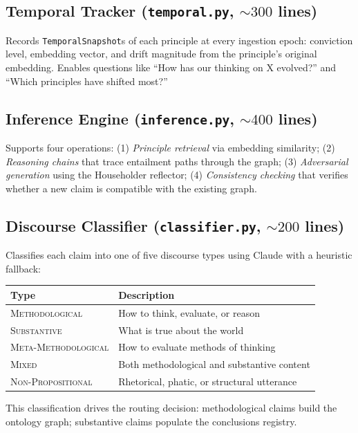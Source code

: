\documentclass[11pt,letterpaper]{article}
\begin{document}
\subsection{Temporal Tracker (\texttt{temporal.py}, ${\sim}300$ lines)}

Records \texttt{TemporalSnapshot}s of each principle at every ingestion epoch: conviction level, embedding vector, and drift magnitude from the principle's original embedding. Enables questions like ``How has our thinking on X evolved?'' and ``Which principles have shifted most?''

\subsection{Inference Engine (\texttt{inference.py}, ${\sim}400$ lines)}

Supports four operations: (1) \emph{Principle retrieval} via embedding similarity; (2) \emph{Reasoning chains} that trace entailment paths through the graph; (3) \emph{Adversarial generation} using the Householder reflector; (4) \emph{Consistency checking} that verifies whether a new claim is compatible with the existing graph.

\subsection{Discourse Classifier (\texttt{classifier.py}, ${\sim}200$ lines)}

Classifies each claim into one of five discourse types using Claude with a heuristic fallback:

\begin{center}
\begin{tabular}{ll}
\toprule
\textbf{Type} & \textbf{Description} \\
\midrule
\textsc{Methodological} & How to think, evaluate, or reason \\
\textsc{Substantive} & What is true about the world \\
\textsc{Meta-Methodological} & How to evaluate methods of thinking \\
\textsc{Mixed} & Both methodological and substantive content \\
\textsc{Non-Propositional} & Rhetorical, phatic, or structural utterance \\
\bottomrule
\end{tabular}
\end{center}

This classification drives the routing decision: methodological claims build the ontology graph; substantive claims populate the conclusions registry.
\end{document}
